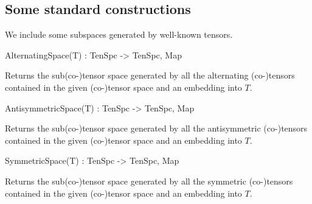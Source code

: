 \subsection{Some standard constructions}

We include some subspaces generated by well-known tensors.

\begin{intrinsics}
AlternatingSpace(T) : TenSpc -> TenSpc, Map
\end{intrinsics}

Returns the sub(co-)tensor space generated by all the alternating (co-)tensors contained in the given (co-)tensor space and an embedding into $T$.

\begin{intrinsics}
AntisymmetricSpace(T) : TenSpc -> TenSpc, Map
\end{intrinsics}

Returns the sub(co-)tensor space generated by all the antisymmetric (co-)tensors contained in the given (co-)tensor space and an embedding into $T$.

\begin{intrinsics}
SymmetricSpace(T) : TenSpc -> TenSpc, Map
\end{intrinsics}

Returns the sub(co-)tensor space generated by all the symmetric (co-)tensors contained in the given (co-)tensor space  and an embedding into $T$.

